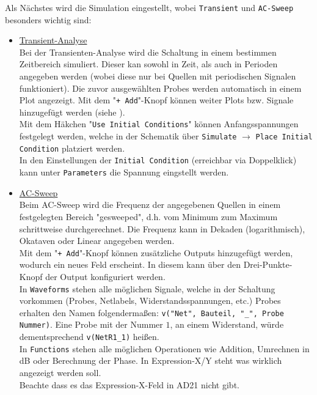 Als Nächstes wird die Simulation eingestellt, wobei \verb|Transient| und \verb|AC-Sweep| besonders wichtig sind:
\begin{itemize}
    \item \underline{Transient-Analyse} \\
    Bei der Transienten-Analyse wird die Schaltung in einem bestimmen Zeitbereich simuliert. Dieser kan sowohl in Zeit, als auch in Perioden angegeben werden (wobei diese nur bei Quellen mit periodischen Signalen funktioniert). Die zuvor ausgewählten Probes werden automatisch in einem Plot angezeigt. Mit dem "\verb|+ Add|"-Knopf können weiter Plots bzw. Signale hinzugefügt werden (siehe ). \\
    Mit dem Häkchen "\verb|Use Initial Conditions|" können Anfangsspannungen festgelegt werden, welche in der Schematik über \verb|Simulate| $\rightarrow$ \verb|Place Initial Condition| platziert werden. \\
    In den Einstellungen der \verb|Initial Condition| (erreichbar via Doppelklick) kann unter \verb|Parameters| die Spannung eingstellt werden.

    \item \underline{AC-Sweep} \\
    Beim AC-Sweep wird die Frequenz der angegebenen Quellen in einem festgelegten Bereich "gesweeped", d.h. vom Minimum zum Maximum schrittweise durchgerechnet. Die Frequenz kann in Dekaden (logarithmisch), Okataven oder Linear angegeben werden. \\

    Mit dem "\verb|+ Add|"-Knopf können zusätzliche Outputs hinzugefügt werden, wodurch ein neues Feld erscheint. In diesem kann über den Drei-Punkte-Knopf der Output konfiguriert werden.\\

    In \verb|Waveforms| stehen alle möglichen Signale, welche in der Schaltung vorkommen (Probes, Netlabels, Widerstandsspannungen, etc.) Probes erhalten den Namen folgendermaßen: \verb|v("Net", Bauteil, "_", Probe Nummer)|. Eine Probe mit der Nummer $1$, an einem Widerstand, würde dementsprechend \verb|v(NetR1_1)| heißen. \\

    In \verb|Functions| stehen alle möglichen Operationen wie Addition, Umrechnen in dB oder Berechnung der Phase. In Expression-X/Y steht was wirklich angezeigt werden soll. \\
    Beachte dass es das Expression-X-Feld in AD21 nicht gibt.


\end{itemize}
